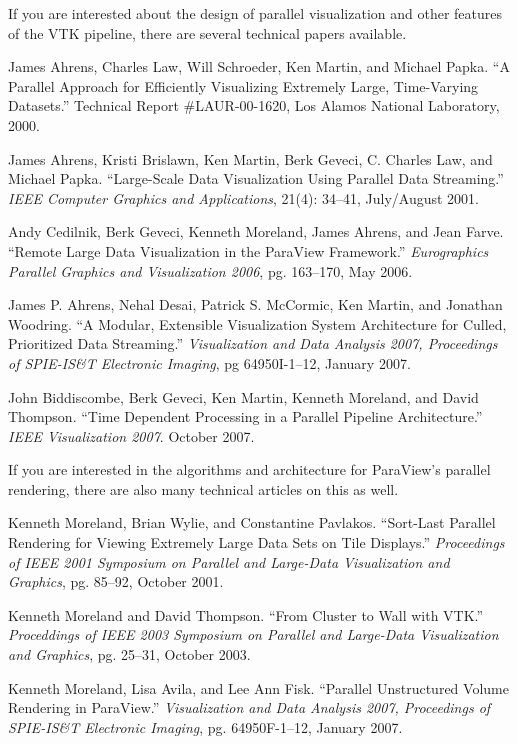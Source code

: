 If you are interested about the design of parallel visualization and other
features of the VTK pipeline, there are several technical papers available.

\begin{reflist}
\item James Ahrens, Charles Law, Will Schroeder, Ken Martin, and Michael
  Papka.  “A Parallel Approach for Efficiently Visualizing Extremely Large,
  Time-Varying Datasets.”  Technical Report \#LAUR-00-1620, Los Alamos
  National Laboratory, 2000.
\item James Ahrens, Kristi Brislawn, Ken Martin, Berk Geveci, C. Charles
  Law, and Michael Papka.  “Large-Scale Data Visualization Using Parallel
  Data Streaming.”  \emph{IEEE Computer Graphics and Applications}, 21(4):
  34–41, July/August 2001.
\item Andy Cedilnik, Berk Geveci, Kenneth Moreland, James Ahrens, and Jean
  Farve.  “Remote Large Data Visualization in the ParaView Framework.”
  \emph{Eurographics Parallel Graphics and Visualization 2006},
  pg. 163–170, May 2006.
\item James P. Ahrens, Nehal Desai, Patrick S. McCormic, Ken Martin, and
  Jonathan Woodring.  “A Modular, Extensible Visualization System
  Architecture for Culled, Prioritized Data Streaming.”
  \emph{Visualization and Data Analysis 2007, Proceedings of SPIE-IS\&T
    Electronic Imaging}, pg 64950I-1–12, January 2007.
\item John Biddiscombe, Berk Geveci, Ken Martin, Kenneth Moreland, and
  David Thompson.  “Time Dependent Processing in a Parallel Pipeline
  Architecture.” \emph{IEEE Visualization 2007}.  October 2007.
\end{reflist}

If you are interested in the algorithms and architecture for ParaView’s
parallel rendering, there are also many technical articles on this as well.

\begin{reflist}
\item Kenneth Moreland, Brian Wylie, and Constantine Pavlakos.  “Sort-Last
  Parallel Rendering for Viewing Extremely Large Data Sets on Tile
  Displays.”  \emph{Proceedings of IEEE 2001 Symposium on Parallel and
    Large-Data Visualization and Graphics}, pg. 85–92, October 2001.
\item Kenneth Moreland and David Thompson.  “From Cluster to Wall with
  VTK.”  \emph{Proceddings of IEEE 2003 Symposium on Parallel and
    Large-Data Visualization and Graphics}, pg. 25–31, October 2003.
\item Kenneth Moreland, Lisa Avila, and Lee Ann Fisk.  “Parallel
  Unstructured Volume Rendering in ParaView.”  \emph{Visualization and Data
  Analysis 2007, Proceedings of SPIE-IS\&T Electronic Imaging},
  pg. 64950F-1–12, January 2007.
\end{reflist}



